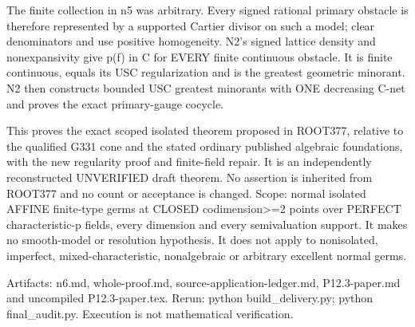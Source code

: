 \documentclass[11pt]{article}
\begin{document}
\begin{OwnProofBody}
The finite collection in n5 was arbitrary. Every signed rational primary obstacle is therefore represented by a supported Cartier divisor on such a model; clear denominators and use positive homogeneity. N2's signed lattice density and nonexpansivity give p(f) in C for EVERY finite continuous obstacle. It is finite continuous, equals its USC regularization and is the greatest geometric minorant. N2 then constructs bounded USC greatest minorants with ONE decreasing C-net and proves the exact primary-gauge cocycle.

This proves the exact scoped isolated theorem proposed in ROOT377, relative to the qualified G331 cone and the stated ordinary published algebraic foundations, with the new regularity proof and finite-field repair. It is an independently reconstructed UNVERIFIED draft theorem. No assertion is inherited from ROOT377 and no count or acceptance is changed. Scope: normal isolated AFFINE finite-type germs at CLOSED codimension>=2 points over PERFECT characteristic-p fields, every dimension and every semivaluation support. It makes no smooth-model or resolution hypothesis. It does not apply to nonisolated, imperfect, mixed-characteristic, nonalgebraic or arbitrary excellent normal germs.

Artifacts: n6.md, whole-proof.md, source-application-ledger.md, P12.3-paper.md and uncompiled P12.3-paper.tex. Rerun: python build_delivery.py; python final_audit.py. Execution is not mathematical verification.

\end{OwnProofBody}
\end{document}
